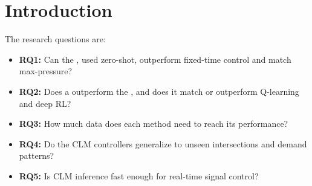 \section{Introduction}
\label{sec:introduction}



The research questions are:
\begin{itemize}
  \item \textbf{RQ1:} Can the \clmbase, used zero-shot, outperform fixed-time control and match max-pressure?
  \item \textbf{RQ2:} Does a \clmtraffic{} outperform the \clmbase, and does it match or outperform Q-learning and
        deep RL?
  \item \textbf{RQ3:} How much data does each method need to reach its performance?
  \item \textbf{RQ4:} Do the CLM controllers generalize to unseen intersections and demand patterns?
  \item \textbf{RQ5:} Is CLM inference fast enough for real-time signal control?
\end{itemize}

